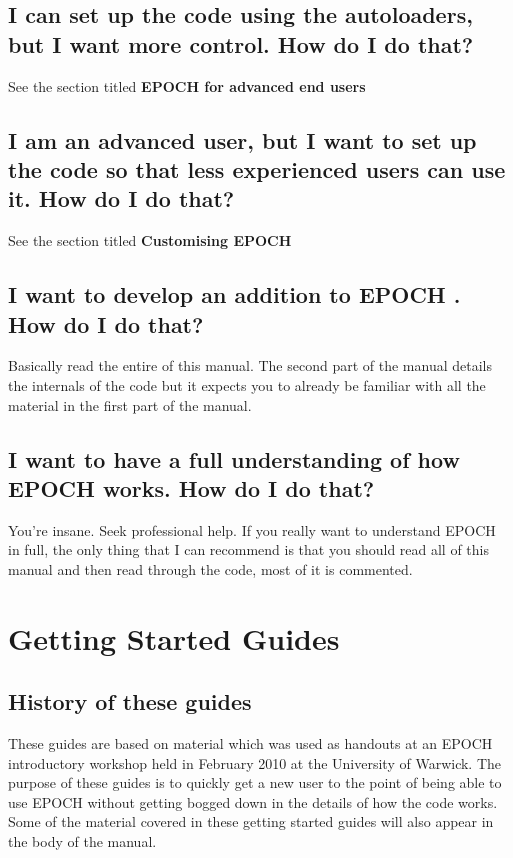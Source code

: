 \documentclass[12pt]{article}
\newcommand{\EPOCH}{{\color{warwickdark}\fontfamily{phv}\selectfont EPOCH} }
\begin{document}
\subsection{I can set up the code using the autoloaders, but I want more
  control. How do I do that?}
See the section titled {\bf \EPOCH for advanced end users}

\subsection{I am an advanced user, but I want to set up the code so that less
  experienced users can use it. How do I do that?}
See the section titled {\bf Customising \EPOCH}

\subsection{I want to develop an addition to \EPOCH. How do I do that?}
Basically read the entire of this manual. The second part of the manual details
the internals of the code but it expects you to already be familiar with all
the material in the first part of the manual.

\subsection{I want to have a full understanding of how \EPOCH works. How do I
  do that?}
You're insane. Seek professional help. If you really want to understand \EPOCH
in full, the only thing that I can recommend is that you should read all of
this manual and then read through the code, most of it is commented.
\pagebreak

\section{Getting Started Guides}

\subsection{History of these guides}
These guides are based on material which was used as handouts at an \EPOCH
introductory workshop held in February 2010 at the University of Warwick. The
purpose of these guides is to quickly get a new user to the point of being able
to use \EPOCH without getting bogged down in the details of how the code
works. Some of the material covered in these getting started guides will also
appear in the body of the manual.
\pagebreak
\end{document}
